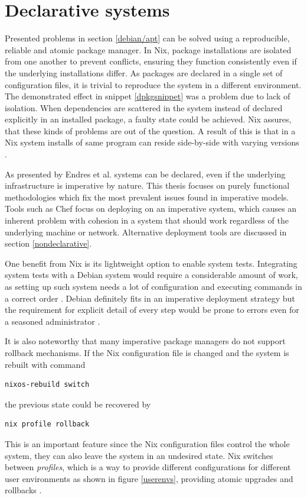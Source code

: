 \section{Declarative systems} \label{declarativesystems}

Presented problems in section \ref{debian/apt} can be solved using a
reproducible, reliable and atomic package manager. In Nix, package
installations are isolated from one another to prevent conflicts,
ensuring they function consistently even if the underlying
installations differ. As packages are declared in a single set of
configuration files, it is trivial to reproduce the system in a
different environment. The demonstrated effect in snippet
\ref{dpkgsnippet} was a problem due to lack of isolation. When
dependencies are scattered in the system instead of declared
explicitly in an installed package, a faulty state could be
achieved. Nix assures, that these kinds of problems are out of the
question. A result of this is that in a Nix system installs of same
program can reside side-by-side with varying versions
\cite{dolstra2008nixos}.

As presented by Endres et al. \cite{endres2017declarative} systems can be declared, even if the
underlying infrastructure is imperative by nature. This thesis focuses on purely functional
methodologies which fix the most prevalent issues found in
imperative models. Tools such as Chef focus on deploying on an
imperative system, which causes an inherent problem with cohesion in a
system that should work regardless of the underlying machine or
network. Alternative deployment tools are discussed in section
\ref{nondeclarative}.

One benefit from Nix is its lightweight option to enable system
tests. Integrating system tests with a Debian system would require a
considerable amount of work, as setting up such system needs a lot of
configuration and executing commands in a correct order
\cite{van2010automating}. Debian definitely fits in an imperative
deployment strategy but the requirement for explicit detail of every
step would be prone to errors even for a seasoned administrator
\cite{breitenbucher2017declarative}.

It is also noteworthy that many imperative package managers do not 
support rollback mechanisms. If the Nix configuration file is changed
and the system is rebuilt with command
\begin{lstlisting}
nixos-rebuild switch
\end{lstlisting}
the previous state could be recovered by
\begin{lstlisting}
nix profile rollback
\end{lstlisting}
This is an important feature since the Nix configuration files control
the whole system, they can also leave the system in an undesired
state. Nix switches between \textit{profiles}, which is a way to
provide different configurations for different user environments as
shown in figure \ref{userenvs}, providing atomic upgrades and
rollbacks \cite{nixosNixOSManual}.

